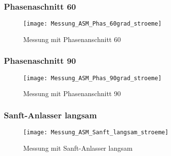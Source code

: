 \subsubsection*{Phasenaschnitt 60\textdegree}
\begin{figure}[ht!]
	\centering
	\texttt{[image: Messung\_ASM\_Phas\_60grad\_stroeme]}	
	\caption{Messung mit Phasenanschnitt 60\textdegree}\label{fig:Mess_Phas_60grad_stroeme}
\end{figure}

\newpage
\subsubsection*{Phasenaschnitt 90\textdegree}
\begin{figure}[ht!]
	\centering
	\texttt{[image: Messung\_ASM\_Phas\_90grad\_stroeme]}	
	\caption{Messung mit Phasenanschnitt 90\textdegree}\label{fig:Mess_Phas_90grad_stroeme}
\end{figure}

\newpage
\subsubsection*{Sanft-Anlasser langsam}
\begin{figure}[ht!]
	\centering
	\texttt{[image: Messung\_ASM\_Sanft\_langsam\_stroeme]}	
	\caption{Messung mit Sanft-Anlasser langsam}\label{fig:Mess_Sanft_langsam_stroeme}
\end{figure}




